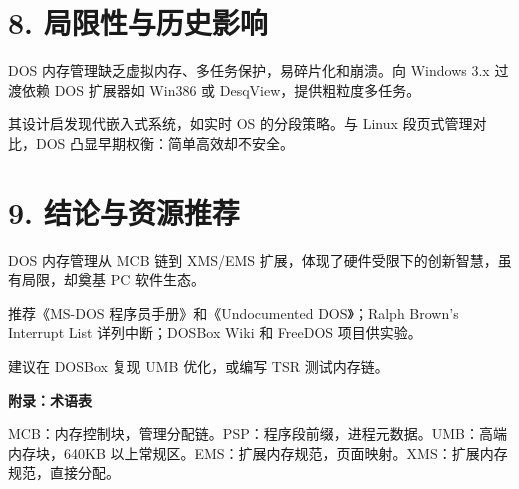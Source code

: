 \chapter{8. 局限性与历史影响}
DOS 内存管理缺乏虚拟内存、多任务保护，易碎片化和崩溃。向 Windows 3.x 过渡依赖 DOS 扩展器如 Win386 或 DesqView，提供粗粒度多任务。\par
其设计启发现代嵌入式系统，如实时 OS 的分段策略。与 Linux 段页式管理对比，DOS 凸显早期权衡：简单高效却不安全。\par
\chapter{9. 结论与资源推荐}
DOS 内存管理从 MCB 链到 XMS/EMS 扩展，体现了硬件受限下的创新智慧，虽有局限，却奠基 PC 软件生态。\par
推荐《MS-DOS 程序员手册》和《Undocumented DOS》；Ralph Brown's Interrupt List 详列中断；DOSBox Wiki 和 FreeDOS 项目供实验。\par
建议在 DOSBox 复现 UMB 优化，或编写 TSR 测试内存链。\par
\textbf{附录：术语表}\par
MCB：内存控制块，管理分配链。PSP：程序段前缀，进程元数据。UMB：高端内存块，640KB 以上常规区。EMS：扩展内存规范，页面映射。XMS：扩展内存规范，直接分配。\par
